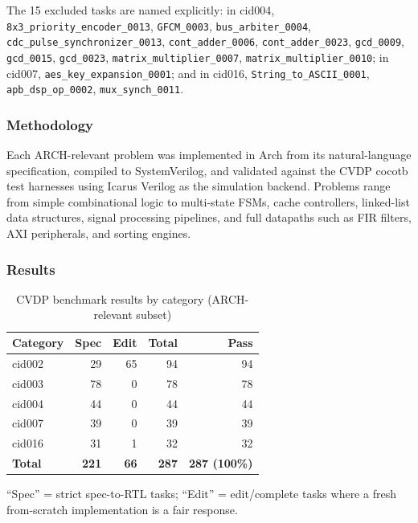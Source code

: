 \documentclass[11pt,twocolumn]{article}
\begin{document}
The 15 excluded tasks are named explicitly: in cid004, \texttt{8x3\_priority\_encoder\_0013}, \texttt{GFCM\_0003}, \texttt{bus\_arbiter\_0004}, \texttt{cdc\_pulse\_synchronizer\_0013}, \texttt{cont\_adder\_0006}, \texttt{cont\_adder\_0023}, \texttt{gcd\_0009}, \texttt{gcd\_0015}, \texttt{gcd\_0023}, \texttt{matrix\_multiplier\_0007}, \texttt{matrix\_multiplier\_0010}; in cid007, \texttt{aes\_key\_expansion\_0001}; and in cid016, \texttt{String\_to\_ASCII\_0001}, \texttt{apb\_dsp\_op\_0002}, \texttt{mux\_synch\_0011}.

\subsubsection{Methodology}

Each ARCH-relevant problem was implemented in Arch from its natural-language specification, compiled to SystemVerilog, and validated against the CVDP cocotb test harnesses using Icarus Verilog as the simulation backend. Problems range from simple combinational logic to multi-state FSMs, cache controllers, linked-list data structures, signal processing pipelines, and full datapaths such as FIR filters, AXI peripherals, and sorting engines.

\subsubsection{Results}

\begin{table}[t]
\centering
\caption{CVDP benchmark results by category (ARCH-relevant subset)}
\label{tab:cvdp}
\footnotesize
\setlength{\tabcolsep}{3pt}
\begin{tabular}{@{}lrrrr@{}}
\toprule
\textbf{Category} & \textbf{Spec} & \textbf{Edit} & \textbf{Total} & \textbf{Pass} \\
\midrule
cid002 & 29 & 65 & 94 & 94 \\
cid003 & 78 & 0 & 78 & 78 \\
cid004 & 44 & 0 & 44 & 44 \\
cid007 & 39 & 0 & 39 & 39 \\
cid016 & 31 & 1 & 32 & 32 \\
\midrule
\textbf{Total} & \textbf{221} & \textbf{66} & \textbf{287} & \textbf{287 (100\%)} \\
\bottomrule
\end{tabular}

\vspace{0.5em}
\raggedright\footnotesize
``Spec'' = strict spec-to-RTL tasks; ``Edit'' = edit/complete tasks where a fresh from-scratch implementation is a fair response.
\end{table}
\end{document}

